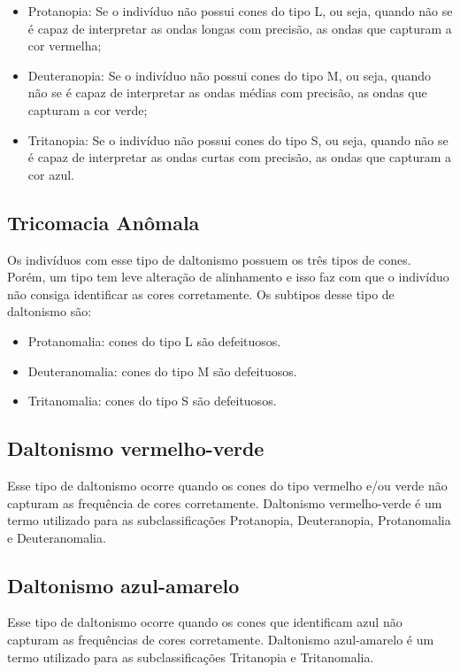 \documentclass[	12pt, Times, openright, twoside, a4paper, english, brazil]{abntex2}
\begin{document}
\begin{itemize}
\item Protanopia: Se o indivíduo não possui cones do tipo L, ou seja, quando não se é capaz de interpretar as ondas longas com precisão, as ondas que capturam a cor vermelha;
\item Deuteranopia: Se o indivíduo não possui cones do tipo M, ou seja, quando não se é capaz de interpretar as ondas médias com precisão, as ondas que capturam a cor verde;
\item Tritanopia: Se o indivíduo não possui cones do tipo S, ou seja, quando não se é capaz de interpretar as ondas curtas com precisão, as ondas que capturam a cor azul.
\end{itemize}

\subsection{Tricomacia Anômala}

Os indivíduos com esse tipo de daltonismo possuem os três tipos de cones. Porém, um tipo tem leve alteração de alinhamento e isso faz com que o indivíduo não consiga identificar as cores corretamente. Os subtipos desse tipo de daltonismo são:

\begin{itemize}
\item Protanomalia: cones do tipo L são defeituosos.
\item Deuteranomalia: cones do tipo M são defeituosos.
\item Tritanomalia: cones do tipo S são defeituosos.
\end{itemize}

\subsection{Daltonismo vermelho-verde}
Esse tipo de daltonismo ocorre quando os cones do tipo vermelho e/ou verde não capturam as frequência de cores corretamente. Daltonismo vermelho-verde é um termo utilizado para as subclassificações Protanopia, Deuteranopia, Protanomalia e Deuteranomalia.

\subsection{Daltonismo azul-amarelo}
Esse tipo de daltonismo ocorre quando os cones que identificam azul não capturam as frequências de cores corretamente. Daltonismo azul-amarelo é um termo utilizado para as subclassificações Tritanopia e Tritanomalia.
\end{document}

